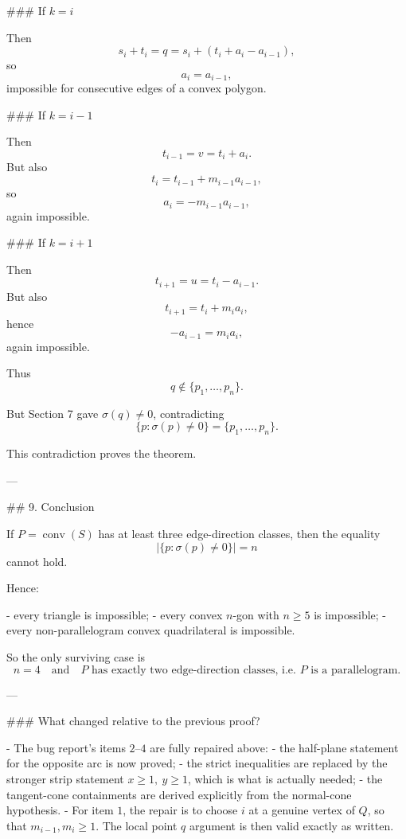 ### If \(k=i\)

Then
\[
s_i+t_i=q=s_i+(t_i+a_i-a_{i-1}),
\]
so
\[
a_i=a_{i-1},
\]
impossible for consecutive edges of a convex polygon.

### If \(k=i-1\)

Then
\[
t_{i-1}=v=t_i+a_i.
\]
But also
\[
t_i=t_{i-1}+m_{i-1}a_{i-1},
\]
so
\[
a_i=-m_{i-1}a_{i-1},
\]
again impossible.

### If \(k=i+1\)

Then
\[
t_{i+1}=u=t_i-a_{i-1}.
\]
But also
\[
t_{i+1}=t_i+m_i a_i,
\]
hence
\[
-a_{i-1}=m_i a_i,
\]
again impossible.

Thus
\[
q\notin\{p_1,\dots,p_n\}.
\]

But Section 7 gave \(\sigma(q)\neq 0\), contradicting
\[
\{p:\sigma(p)\neq 0\}=\{p_1,\dots,p_n\}.
\]

This contradiction proves the theorem.

---

## 9. Conclusion

If \(P=\operatorname{conv}(S)\) has at least three edge-direction classes, then the equality
\[
\bigl|\{p:\sigma(p)\neq 0\}\bigr|=n
\]
cannot hold.

Hence:

- every triangle is impossible;
- every convex \(n\)-gon with \(n\ge 5\) is impossible;
- every non-parallelogram convex quadrilateral is impossible.

So the only surviving case is
\[
n=4
\quad\text{and}\quad
P\text{ has exactly two edge-direction classes, i.e. }P\text{ is a parallelogram}.
\]

---

### What changed relative to the previous proof?

- The bug report’s items \(2\)–\(4\) are fully repaired above:
  - the half-plane statement for the opposite arc is now proved;
  - the strict inequalities are replaced by the stronger strip statement \(x\ge 1,\ y\ge 1\), which is what is actually needed;
  - the tangent-cone containments are derived explicitly from the normal-cone hypothesis.
- For item \(1\), the repair is to choose \(i\) at a genuine vertex of \(Q\), so that \(m_{i-1},m_i\ge 1\). The local point \(q\) argument is then valid exactly as written.
